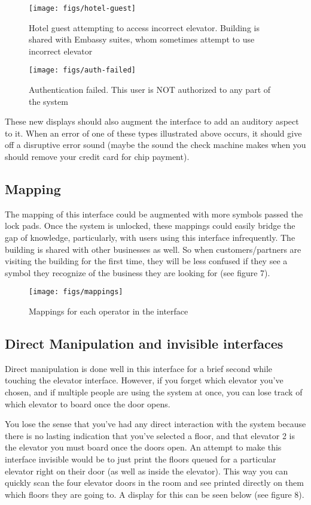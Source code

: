 \begin{figure}[H]
  \centering
  \texttt{[image: figs/hotel-guest]}
  \caption{Hotel guest attempting to access incorrect elevator. Building is shared with Embassy suites, whom sometimes attempt to use incorrect elevator}
  \label{fig::1}
\end{figure}

\begin{figure}[H]
  \centering
  \texttt{[image: figs/auth-failed]}
  \caption{Authentication failed. This user is NOT authorized to any part of the system}
  \label{fig::1}
\end{figure}

These new displays should also augment the interface to add an auditory aspect to it. When an error of one of these types illustrated above occurs, it should give off a disruptive error sound (maybe the sound the check machine makes when you should remove your credit card for chip payment).

\subsection{Mapping}
The mapping of this interface could be augmented with more symbols passed the lock pads. Once the system is unlocked, these mappings could easily bridge the gap of knowledge, particularly, with users using this interface infrequently. The building is shared with other businesses as well. So when customers/partners are visiting the building for the first time, they will be less confused if they see a symbol they recognize of the business they are looking for (see figure 7).

\begin{figure}[H]
  \centering
  \texttt{[image: figs/mappings]}
  \caption{Mappings for each operator in the interface}
  \label{fig::1}
\end{figure}

\subsection{Direct Manipulation and invisible interfaces}
Direct manipulation is done well in this interface for a brief second while touching the elevator interface. However, if you forget which elevator you've chosen, and if multiple people are using the system at once, you can lose track of which elevator to board once the door opens.

You lose the sense that you've had any direct interaction with the system because there is no lasting indication that you've selected a floor, and that elevator 2 is the elevator you must board once the doors open. An attempt to make this interface invisible would be to just print the floors queued for a particular elevator right on their door (as well as inside the elevator). This way you can quickly scan the four elevator doors in the room and see printed directly on them which floors they are going to. A display for this can be seen below (see figure 8).

